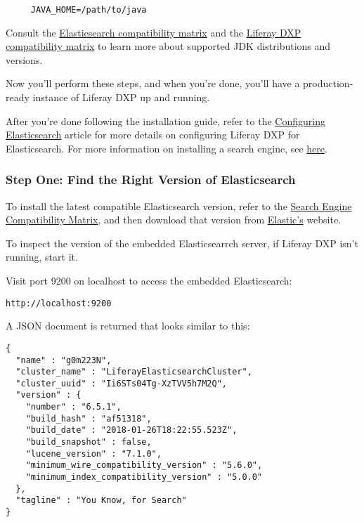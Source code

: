 \begin{verbatim}
     JAVA_HOME=/path/to/java
\end{verbatim}

Consult the
\href{https://www.elastic.co/support/matrix\#matrix_jvm}{Elasticsearch
compatibility matrix} and the
\href{https://help.liferay.com/hc/en-us/articles/360016285432-Liferay-DXP-7-1-Compatibility-Matrix}{Liferay
DXP compatibility matrix} to learn more about supported JDK
distributions and versions.

\noindent\hrulefill

Now you'll perform these steps, and when you're done, you'll have a
production-ready instance of Liferay DXP up and running.

After you're done following the installation guide, refer to the
\href{discover/deployment/-/knowledge_base/7-1/configuring-elasticsearch-for-liferay-0}{Configuring
Elasticsearch} article for more details on configuring Liferay DXP for
Elasticsearch. For more information on installing a search engine, see
\href{discover/deployment/-/knowledge_base/7-1/installing-a-search-engine}{here}.

\subsubsection{Step One: Find the Right Version of
Elasticsearch}\label{step-one-find-the-right-version-of-elasticsearch}

To install the latest compatible Elasticsearch version, refer to the
\href{https://help.liferay.com/hc/en-us/articles/360016511651\#Liferay-DXP-7.1}{Search
Engine Compatibility Matrix}, and then download that version from
\href{https://www.elastic.co}{Elastic's} website.

To inspect the version of the embedded Elasticsearrch server, if Liferay
DXP isn't running, start it.

Visit port 9200 on localhost to access the embedded Elasticsearch:

\begin{verbatim}
http://localhost:9200
\end{verbatim}

A JSON document is returned that looks similar to this:

\begin{verbatim}
{
  "name" : "g0m223N",
  "cluster_name" : "LiferayElasticsearchCluster",
  "cluster_uuid" : "Ii6STs04Tg-XzTVV5h7M2Q",
  "version" : {
    "number" : "6.5.1",
    "build_hash" : "af51318",
    "build_date" : "2018-01-26T18:22:55.523Z",
    "build_snapshot" : false,
    "lucene_version" : "7.1.0",
    "minimum_wire_compatibility_version" : "5.6.0",
    "minimum_index_compatibility_version" : "5.0.0"
  },
  "tagline" : "You Know, for Search"
}
\end{verbatim}

